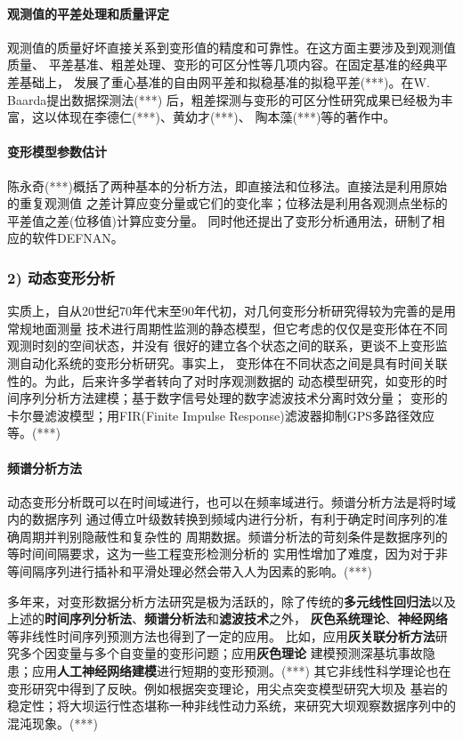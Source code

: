 \paragraph*{观测值的平差处理和质量评定}
观测值的质量好坏直接关系到变形值的精度和可靠性。在这方面主要涉及到观测值质量、
平差基准、粗差处理、变形的可区分性等几项内容。在固定基准的经典平差基础上，
发展了重心基准的自由网平差和拟稳基准的拟稳平差(***)。在W. Baarda提出数据探测法(***)
后，粗差探测与变形的可区分性研究成果已经极为丰富，这以体现在李德仁(***)、黄幼才(***)、
陶本藻(***)等的著作中。
\paragraph*{变形模型参数估计}
陈永奇(***)概括了两种基本的分析方法，即直接法和位移法。直接法是利用原始的重复观测值
之差计算应变分量或它们的变化率；位移法是利用各观测点坐标的平差值之差(位移值)计算应变分量。
同时他还提出了变形分析通用法，研制了相应的软件DEFNAN。

\subsubsection*{2) 动态变形分析}
实质上，自从20世纪70年代末至90年代初，对几何变形分析研究得较为完善的是用常规地面测量
技术进行周期性监测的静态模型，但它考虑的仅仅是变形体在不同观测时刻的空间状态，并没有
很好的建立各个状态之间的联系，更谈不上变形监测自动化系统的变形分析研究。事实上，
变形体在不同状态之间是具有时间关联性的。为此，后来许多学者转向了对时序观测数据的
动态模型研究，如变形的时间序列分析方法建模；基于数字信号处理的数字滤波技术分离时效分量；
变形的卡尔曼滤波模型；用FIR(Finite Impulse Response)滤波器抑制GPS多路径效应等。(***)
\paragraph*{频谱分析方法}
动态变形分析既可以在时间域进行，也可以在频率域进行。频谱分析方法是将时域内的数据序列
通过傅立叶级数转换到频域内进行分析，有利于确定时间序列的准确周期并判别隐蔽性和复杂性的
周期数据。频谱分析法的苛刻条件是数据序列的等时间间隔要求，这为一些工程变形检测分析的
实用性增加了难度，因为对于非等间隔序列进行插补和平滑处理必然会带入人为因素的影响。(***)

多年来，对变形数据分析方法研究是极为活跃的，除了传统的\textbf{多元线性回归法}以及
上述的\textbf{时间序列分析法}、\textbf{频谱分析法}和\textbf{滤波技术}之外，
\textbf{灰色系统理论}、\textbf{神经网络}等非线性时间序列预测方法也得到了一定的应用。
比如，应用\textbf{灰关联分析方法}研究多个因变量与多个自变量的变形问题；应用\textbf{灰色理论}
建模预测深基坑事故隐患；应用\textbf{人工神经网络建模}进行短期的变形预测。(***)
其它非线性科学理论也在变形研究中得到了反映。例如根据突变理论，用尖点突变模型研究大坝及
基岩的稳定性；将大坝运行性态堪称一种非线性动力系统，来研究大坝观察数据序列中的混沌现象。(***)

